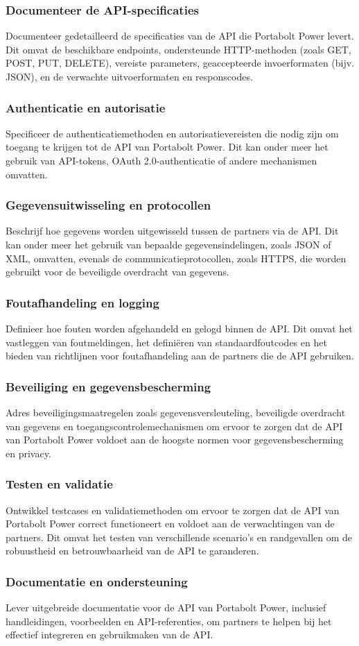 \documentclass[../main.tex]{subfiles}
\begin{document}
\subsubsection{Documenteer de API-specificaties}
Documenteer gedetailleerd de specificaties van de API die Portabolt Power levert. Dit omvat de beschikbare endpoints, ondersteunde HTTP-methoden (zoals GET, POST, PUT, DELETE), vereiste parameters, geaccepteerde invoerformaten (bijv. JSON), en de verwachte uitvoerformaten en responscodes.

\subsubsection{Authenticatie en autorisatie}
Specificeer de authenticatiemethoden en autorisatievereisten die nodig zijn om toegang te krijgen tot de API van Portabolt Power. Dit kan onder meer het gebruik van API-tokens, OAuth 2.0-authenticatie of andere mechanismen omvatten.

\subsubsection{Gegevensuitwisseling en protocollen}
Beschrijf hoe gegevens worden uitgewisseld tussen de partners via de API. Dit kan onder meer het gebruik van bepaalde gegevensindelingen, zoals JSON of XML, omvatten, evenals de communicatieprotocollen, zoals HTTPS, die worden gebruikt voor de beveiligde overdracht van gegevens.

\subsubsection{Foutafhandeling en logging}
Definieer hoe fouten worden afgehandeld en gelogd binnen de API. Dit omvat het vastleggen van foutmeldingen, het definiëren van standaardfoutcodes en het bieden van richtlijnen voor foutafhandeling aan de partners die de API gebruiken.

\subsubsection{Beveiliging en gegevensbescherming}
Adres beveiligingsmaatregelen zoals gegevensversleuteling, beveiligde overdracht van gegevens en toegangscontrolemechanismen om ervoor te zorgen dat de API van Portabolt Power voldoet aan de hoogste normen voor gegevensbescherming en privacy.

\subsubsection{Testen en validatie}
Ontwikkel testcases en validatiemethoden om ervoor te zorgen dat de API van Portabolt Power correct functioneert en voldoet aan de verwachtingen van de partners. Dit omvat het testen van verschillende scenario's en randgevallen om de robuustheid en betrouwbaarheid van de API te garanderen.

\subsubsection{Documentatie en ondersteuning}
Lever uitgebreide documentatie voor de API van Portabolt Power, inclusief handleidingen, voorbeelden en API-referenties, om partners te helpen bij het effectief integreren en gebruikmaken van de API.
\end{document}
